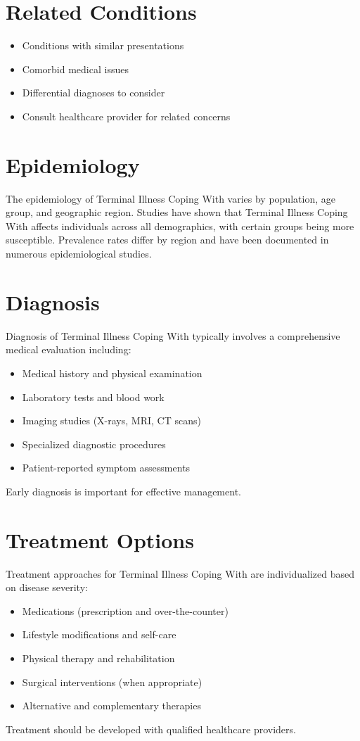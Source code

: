 \section*{Related Conditions}
\begin{itemize}
  \item Conditions with similar presentations
  \item Comorbid medical issues
  \item Differential diagnoses to consider
  \item Consult healthcare provider for related concerns
\end{itemize}

\section*{Epidemiology}
The epidemiology of Terminal Illness Coping With varies by population, age group, and geographic region. Studies have shown that Terminal Illness Coping With affects individuals across all demographics, with certain groups being more susceptible. Prevalence rates differ by region and have been documented in numerous epidemiological studies.

\section*{Diagnosis}
Diagnosis of Terminal Illness Coping With typically involves a comprehensive medical evaluation including:
\begin{itemize}
  \item Medical history and physical examination
  \item Laboratory tests and blood work
  \item Imaging studies (X-rays, MRI, CT scans)
  \item Specialized diagnostic procedures
  \item Patient-reported symptom assessments
\end{itemize}
Early diagnosis is important for effective management.

\section*{Treatment Options}
Treatment approaches for Terminal Illness Coping With are individualized based on disease severity:
\begin{itemize}
  \item Medications (prescription and over-the-counter)
  \item Lifestyle modifications and self-care
  \item Physical therapy and rehabilitation
  \item Surgical interventions (when appropriate)
  \item Alternative and complementary therapies
\end{itemize}
Treatment should be developed with qualified healthcare providers.

